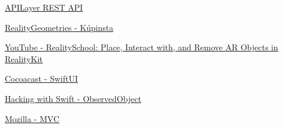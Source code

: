 \documentclass[11pt,a4paper,oneside]{report}
\begin{document}
\hyperlink{https://apilayer.com/marketplace/exchangerates_data-api}{APILayer REST API}

\hyperlink{https://github.com/maxxfrazer/RealityGeometries}{RealityGeometries - Kúpinsta}

\hyperlink{https://www.youtube.com/watch?v=itGRaAryUxA}{YouTube - RealitySchool: Place, Interact with, and Remove AR Objects in RealityKit}

\hyperlink{https://cocoacasts.com/swiftui-fundamentals-what-is-swiftui}{Cocoacast - SwiftUI}

\hyperlink{https://www.hackingwithswift.com/quick-start/swiftui/how-to-use-observedobject-to-manage-state-from-external-objects}{Hacking with Swift - ObservedObject}

\hyperlink{https://developer.mozilla.org/en-US/docs/Glossary/MVC}{Mozilla - MVC}
\end{document}
